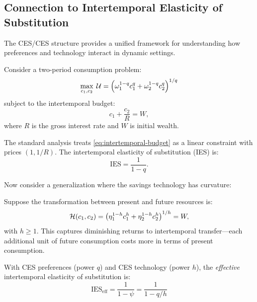 \subsection{Connection to Intertemporal Elasticity of Substitution}
\label{subsec:ies-connection}

The CES/CES structure provides a unified framework for understanding how preferences and technology interact in dynamic settings.

\begin{definition}
\label{def:intertemporal}
Consider a two-period consumption problem:
\begin{equation}
\max_{c_1, c_2} \; \mathcal{U} = \left( \omega_1^{1-q} c_1^{q} + \omega_2^{1-q} c_2^{q} \right)^{1/q}
\end{equation}
subject to the intertemporal budget:
\begin{equation}
\label{eq:intertemporal-budget}
c_1 + \frac{c_2}{R} = W,
\end{equation}
where $R$ is the gross interest rate and $W$ is initial wealth.
\end{definition}

The standard analysis treats \eqref{eq:intertemporal-budget} as a linear constraint with prices $(1, 1/R)$. The intertemporal elasticity of substitution (IES) is:
\begin{equation}
\text{IES} = \frac{1}{1-q}.
\end{equation}

Now consider a generalization where the savings technology has curvature:

\begin{definition}
\label{def:nonlinear-savings}
Suppose the transformation between present and future resources is:
\begin{equation}
\label{eq:ces-technology}
\mathcal{H}(c_1, c_2) = \left( \eta_1^{1-h} c_1^{h} + \eta_2^{1-h} c_2^{h} \right)^{1/h} = W,
\end{equation}
with $h \geq 1$. This captures diminishing returns to intertemporal transfer---each additional unit of future consumption costs more in terms of present consumption.
\end{definition}

\begin{proposition}
\label{prop:effective-ies}
With CES preferences (power $q$) and CES technology (power $h$), the \emph{effective} intertemporal elasticity of substitution is:
\begin{equation}
\boxed{\text{IES}_{\text{eff}} = \frac{1}{1-\psi} = \frac{1}{1 - q/h}}
\end{equation}
\end{proposition}

